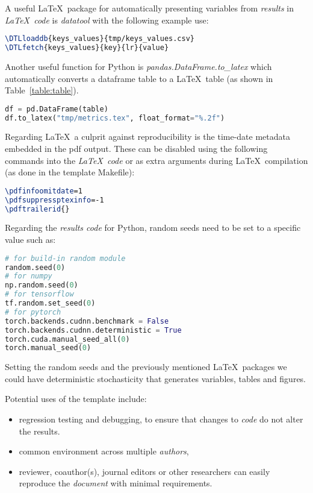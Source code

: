 \documentclass[journal]{IEEEtran}
\begin{document}
A useful \LaTeX\ package for automatically presenting variables from \textit{results} in \textit{\LaTeX\ code} is \textit{datatool} with the following example use:
\begin{lstlisting}[language=TeX, style=lststyle, caption={\LaTeX\ datatool example of loading a file that contains pairs of keys and values (tmp/keys\_values.csv) generated by a \textit{results code} and getting the value of a key named lr.}]
\DTLloaddb{keys_values}{tmp/keys_values.csv}
\DTLfetch{keys_values}{key}{lr}{value}
\end{lstlisting}

Another useful function for Python is \textit{pandas.DataFrame.to\_latex} which automatically converts a dataframe table to a \LaTeX\ table (as shown in Table~\ref{table:table}).
\begin{lstlisting}[language=python, style=lststyle, caption={Convert Pandas DataFrame to \LaTeX\ table.}]
df = pd.DataFrame(table)
df.to_latex("tmp/metrics.tex", float_format="%.2f")
\end{lstlisting}

Regarding \LaTeX\ a culprit against reproducibility is the time-date metadata embedded in the pdf output.
These can be disabled using the following commands into the \textit{\LaTeX\ code} or as extra arguments during \LaTeX\ compilation (as done in the template Makefile):
\begin{lstlisting}[language=TeX, style=lststyle, caption={\LaTeX\ pdf reproducibility commands.}]
\pdfinfoomitdate=1
\pdfsuppressptexinfo=-1
\pdftrailerid{}
\end{lstlisting}

Regarding the \textit{results code} for Python, random seeds need to be set to a specific value such as:
\begin{lstlisting}[language=python, style=lststyle, caption={Python reproducibility commands for some popular libraries.}]
# for build-in random module
random.seed(0)
# for numpy
np.random.seed(0)
# for tensorflow
tf.random.set_seed(0)
# for pytorch
torch.backends.cudnn.benchmark = False
torch.backends.cudnn.deterministic = True
torch.cuda.manual_seed_all(0)
torch.manual_seed(0)
\end{lstlisting}

Setting the random seeds and the previously mentioned \LaTeX\ packages we could have deterministic stochasticity that generates variables, tables and figures.

Potential uses of the template include:
\begin{itemize}
	\item regression testing and debugging, to ensure that changes to \textit{code} do not alter the results.
	\item common environment across multiple \textit{authors},
	\item reviewer, coauthor(s), journal editors or other researchers can easily reproduce the \textit{document} with minimal requirements.
\end{itemize}
\end{document}
